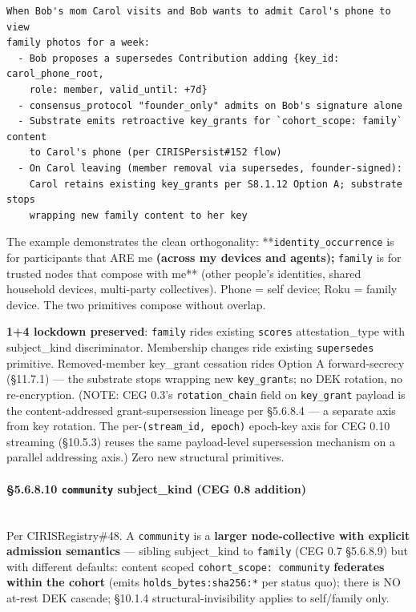 \documentclass[10pt]{article}
\begin{document}
\begin{lstlisting}
When Bob's mom Carol visits and Bob wants to admit Carol's phone to view
family photos for a week:
  - Bob proposes a supersedes Contribution adding {key_id: carol_phone_root,
    role: member, valid_until: +7d}
  - consensus_protocol "founder_only" admits on Bob's signature alone
  - Substrate emits retroactive key_grants for `cohort_scope: family` content
    to Carol's phone (per CIRISPersist#152 flow)
  - On Carol leaving (member removal via supersedes, founder-signed):
    Carol retains existing key_grants per S8.1.12 Option A; substrate stops
    wrapping new family content to her key
\end{lstlisting}

The example demonstrates the clean orthogonality: **\texttt{identity\_occurrence} is for participants that ARE me\textbf{ (across my devices and agents); }\texttt{family} is for trusted nodes that compose with me** (other people's identities, shared household devices, multi-party collectives). Phone = self device; Roku = family device. The two primitives compose without overlap.


\textbf{1+4 lockdown preserved}: \texttt{family} rides existing \texttt{scores} attestation\_type with subject\_kind discriminator. Membership changes ride existing \texttt{supersedes} primitive. Removed-member key\_grant cessation rides Option A forward-secrecy (§11.7.1) — the substrate stops wrapping new \texttt{key\_grant}s; no DEK rotation, no re-encryption. (NOTE: CEG 0.3's \texttt{rotation\_chain} field on \texttt{key\_grant} payload is the content-addressed grant-supersession lineage per §5.6.8.4 — a separate axis from key rotation. The per-\texttt{(stream\_id, epoch)} epoch-key axis for CEG 0.10 streaming (§10.5.3) reuses the same payload-level supersession mechanism on a parallel addressing axis.) Zero new structural primitives.


\paragraph{§5.6.8.10 \texttt{community} subject\_kind (CEG 0.8 addition)}\mbox{}\\


Per CIRISRegistry\#48. A \texttt{community} is a \textbf{larger node-collective with explicit admission semantics} — sibling subject\_kind to \texttt{family} (CEG 0.7 §5.6.8.9) but with different defaults: content scoped \texttt{cohort\_scope: community} \textbf{federates within the cohort} (emits \texttt{holds\_bytes:sha256:*} per status quo); there is NO at-rest DEK cascade; §10.1.4 structural-invisibility applies to self/family only.
\end{document}
